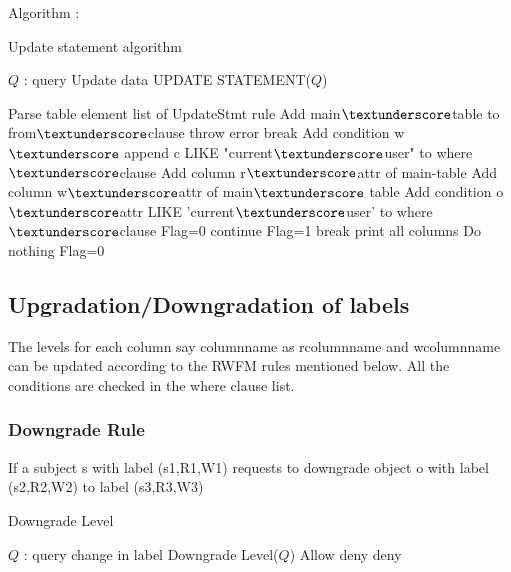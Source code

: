 \documentclass[11pt,a4paper]{report}
\begin{document}
\newpage
Algorithm :
\begin{algorithm}[H]
\caption{Update statement algorithm}
\renewcommand{\algorithmicrequire}{\textbf{Inputs:}}
\begin{algorithmic}[1]
\REQUIRE $Q$ : query
\ENSURE Update data
\STATE UPDATE STATEMENT($Q$)  

  \STATE Parse table element list of UpdateStmt rule
  \STATE Add main$\textunderscore$table to from$\textunderscore$clause
   \STATE throw error
   \STATE break
   \ELSE
   \STATE Add condition w$\textunderscore$ append c LIKE "current$\textunderscore$user" to where$\textunderscore$clause
   \ENDIF
  \ENDFOR
  \STATE Add column r$\textunderscore$attr of main-table
  \STATE Add column w$\textunderscore$attr of main$\textunderscore$ table
  \STATE Add condition o$\textunderscore$attr LIKE 'current$\textunderscore$user' to where$\textunderscore$clause
  \STATE Flag=0
   \STATE continue
   \ELSE
    \STATE Flag=1
   \STATE break
  \ENDIF
  \ENDFOR
   \STATE print all columns
   \ELSE 
    \STATE Do nothing
    \STATE Flag=0
 \ENDIF
\end{algorithmic}
\end{algorithm}



\subsection{Upgradation/Downgradation of labels}

The levels for each column say column\textunderscore name as r\textunderscore column\textunderscore name and w\textunderscore column\textunderscore name can be updated according to the RWFM rules mentioned below. All the conditions are checked in the where clause list. 

\subsubsection{Downgrade Rule}
If a subject s with label (s1,R1,W1) requests to downgrade object o with label (s2,R2,W2) to label (s3,R3,W3) 

\begin{algorithm}[H]
\caption{Downgrade Level}
\renewcommand{\algorithmicrequire}{\textbf{Inputs:}}
\begin{algorithmic}[1]
\REQUIRE $Q$ : query
\ENSURE change in label
\STATE Downgrade Level($Q$) 
   \STATE Allow
   \ELSE 
   \STATE deny
   \ENDIF
  \ELSE 
  \STATE deny
  \ENDIF
\end{algorithmic}
\end{algorithm}
\end{document}
